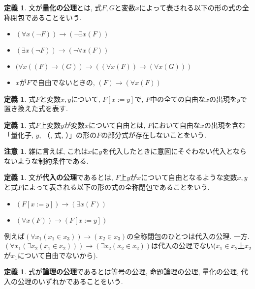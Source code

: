 \documentclass[a4paper, twoside]{bxjsarticle}
\theoremstyle{definition}
\newtheorem{defn}[thm]{定義}
\newtheorem{rem}[thm]{注意}
\begin{document}
    \begin{defn}
        文が\textbf{量化の公理}とは, 式$F, G$と変数$x$によって表される以下の形の式の全称閉包であることをいう.
        \begin{itemize}
            \item $(\forall x (\lnot F)) \to (\lnot \exists x (F))$
            \item $(\exists x (\lnot F)) \to (\lnot \forall x (F))$
            \item $(\forall x ((F) \to (G)) \to ((\forall x (F)) \to (\forall x (G)))$
            \item $x$が$F$で自由でないときの, $(F) \to (\forall x (F))$
        \end{itemize}
    \end{defn}
    \begin{defn}
        式$F$と変数$x, y$について, $F[x := y]$で, $F$中の全ての自由な$x$の出現を$y$で置き換えた式を表す.
    \end{defn}
    \begin{defn}
        式$F$上変数$y$が変数$x$について自由とは, $F$において自由な$x$の出現を含む「量化子, $y$, （, 式, ）」の形の$F$の部分式が存在しないことをいう.
    \end{defn}
    \begin{rem}
        雑に言えば, これは$x$に$y$を代入したときに意図にそぐわない代入とならないような制約条件である.
    \end{rem}
    \begin{defn}
        文が\textbf{代入の公理}であるとは, $F$上$y$が$x$について自由となるような変数$x,y$と式$F$によって表される以下の形の式の全称閉包であることをいう.
        \begin{itemize}
            \item $(F[x := y]) \to (\exists x (F))$
            \item $(\forall x (F)) \to (F[x := y])$
        \end{itemize}
        
        例えば$(\forall x_1 (x_1 \in x_3)) \to (x_2 \in x_3)$の全称閉包のひとつは代入の公理. 一方. $(\forall x_1 (\exists x_2 (x_1 \in x_2))) \to (\exists x_2 (x_2 \in x_2))$は代入の公理でない($x_1 \in x_2$上$x_2$が$x_1$について自由でないから).
    \end{defn}
    \begin{defn}
        式が\textbf{論理の公理}であるとは等号の公理, 命題論理の公理, 量化の公理, 代入の公理のいずれかであることをいう.
    \end{defn}
    
\end{document}
